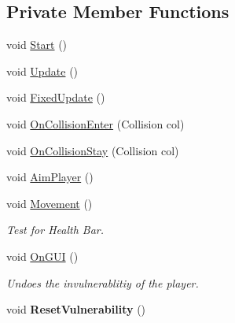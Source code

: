 \subsection*{Private Member Functions}
\begin{DoxyCompactItemize}
\item 
void \hyperlink{class_player_a1a09a3ded16ac1646f6bdd4f25fe0ddd}{Start} ()
\item 
void \hyperlink{class_player_aace80372e18e32fe177e295fe5d93ba8}{Update} ()
\item 
void \hyperlink{class_player_aa0458562e3da0655ecb39a0031114335}{Fixed\+Update} ()
\item 
void \hyperlink{class_player_abd430d273ef011a22a6c63eee5067751}{On\+Collision\+Enter} (Collision col)
\item 
void \hyperlink{class_player_a281fbfe9664d247f3e4d4b2911b00dbe}{On\+Collision\+Stay} (Collision col)
\item 
void \hyperlink{class_player_a65c37e862c41df23b43ffc646ffa9fd0}{Aim\+Player} ()
\item 
void \hyperlink{class_player_a8d9dc0cb892c8fdb15f25e41c7189ebd}{Movement} ()
\begin{DoxyCompactList}\small\item\em Test for Health Bar. \end{DoxyCompactList}\item 
\mbox{\label{class_player_a37c8ce5286efb3918e92a26892a09b12}} 
void \hyperlink{class_player_a37c8ce5286efb3918e92a26892a09b12}{On\+G\+UI} ()
\begin{DoxyCompactList}\small\item\em Undoes the invulnerablitiy of the player. \end{DoxyCompactList}\item 
\mbox{\label{class_player_a368f95446e99f0f007014e5755d91777}} 
void {\bfseries Reset\+Vulnerability} ()
\end{DoxyCompactItemize}
